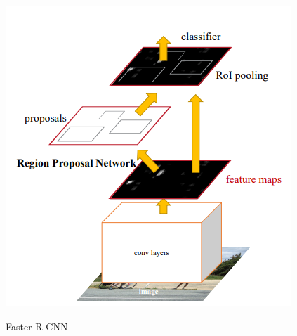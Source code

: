 \documentclass[conference]{IEEEtran}
\begin{document}
\begin{figure}[h]
    \centering
    \includegraphics[width=\linewidth]{1..png}\\
    \caption{Faster R-CNN}
    \label{fig4}
\end{figure}
\end{document}
